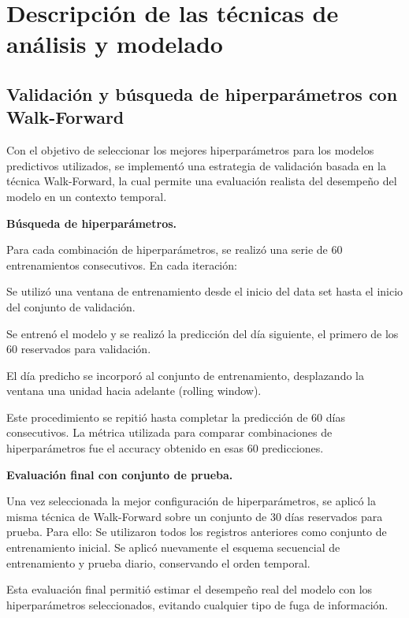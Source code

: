 \documentclass[11pt]{report}
\begin{document}

\section{Descripción de las técnicas de análisis y modelado}

\subsection{Validación y búsqueda de hiperparámetros con Walk-Forward}

Con el objetivo de seleccionar los mejores hiperparámetros para los modelos predictivos utilizados, se implementó una estrategia de validación basada en la técnica Walk-Forward, la cual permite una evaluación realista del desempeño del modelo en un contexto temporal.

\textbf{Búsqueda de hiperparámetros.}

Para cada combinación de hiperparámetros, se realizó una serie de 60 entrenamientos consecutivos. En cada iteración:

Se utilizó una ventana de entrenamiento desde el inicio del data set hasta el inicio del conjunto de validación.

Se entrenó el modelo y se realizó la predicción del día siguiente, el primero de los 60 reservados para validación.

El día predicho se incorporó al conjunto de entrenamiento, desplazando la ventana una unidad hacia adelante (rolling window).

Este procedimiento se repitió hasta completar la predicción de 60 días consecutivos. La métrica utilizada para comparar combinaciones de hiperparámetros fue el accuracy obtenido en esas 60 predicciones.

\textbf{Evaluación final con conjunto de prueba.}

Una vez seleccionada la mejor configuración de hiperparámetros, se aplicó la misma técnica de Walk-Forward sobre un conjunto de 30 días reservados para prueba. 
Para ello:
Se utilizaron todos los registros anteriores como conjunto de entrenamiento inicial.
Se aplicó nuevamente el esquema secuencial de entrenamiento y prueba diario, conservando el orden temporal.

Esta evaluación final permitió estimar el desempeño real del modelo con los hiperparámetros seleccionados, evitando cualquier tipo de fuga de información.
\end{document}
